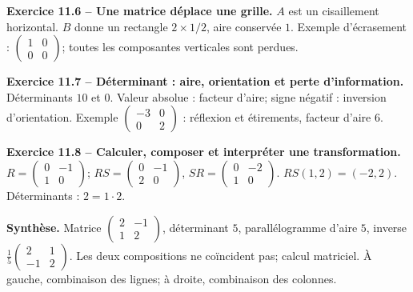 \begin{answerbox}
\textbf{Exercice 11.6 -- Une matrice déplace une grille.} $A$ est un cisaillement horizontal. $B$ donne un rectangle $2\times1/2$, aire conservée $1$. Exemple d'écrasement : $\begin{pmatrix}1&0\\0&0\end{pmatrix}$; toutes les composantes verticales sont perdues.\par
\textbf{Exercice 11.7 -- Déterminant : aire, orientation et perte d'information.} Déterminants $10$ et $0$. Valeur absolue : facteur d'aire; signe négatif : inversion d'orientation. Exemple $\begin{pmatrix}-3&0\\0&2\end{pmatrix}$ : réflexion et étirements, facteur d'aire $6$.\par
\textbf{Exercice 11.8 -- Calculer, composer et interpréter une transformation.} $R=\begin{pmatrix}0&-1\\1&0\end{pmatrix}$; $RS=\begin{pmatrix}0&-1\\2&0\end{pmatrix}$, $SR=\begin{pmatrix}0&-2\\1&0\end{pmatrix}$. $RS(1,2)=(-2,2)$. Déterminants : $2=1\cdot2$.\par
\medskip\textbf{Synthèse.} Matrice $\begin{pmatrix}2&-1\\1&2\end{pmatrix}$, déterminant $5$, parallélogramme d'aire $5$, inverse $\frac15\begin{pmatrix}2&1\\-1&2\end{pmatrix}$. Les deux compositions ne coïncident pas; calcul matriciel. À gauche, combinaison des lignes; à droite, combinaison des colonnes.
\end{answerbox}
